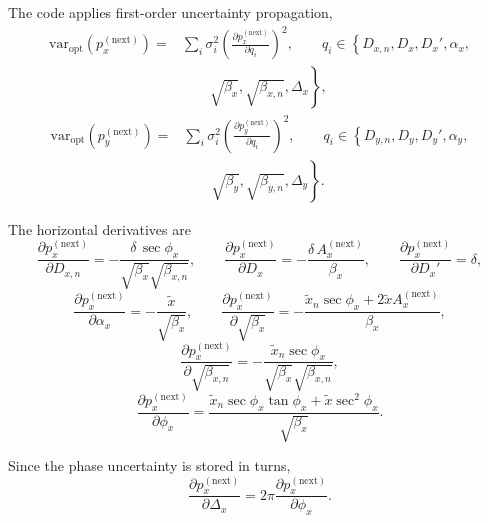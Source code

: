 The code applies first-order uncertainty propagation,
\begin{equation}
\begin{split}
\mathrm{var}_{\mathrm{opt}}\!\left(p_x^{(\mathrm{next})}\right)
=&
\sum_i \sigma_i^2
\left(
\frac{\partial p_x^{(\mathrm{next})}}{\partial q_i}
\right)^2,
\qquad q_i \in \left\{
D_{x,n}, D_x, D_x', \alpha_x,\right.\\
&\qquad\left.\sqrt{\beta_x}, \sqrt{\beta_{x,n}}, \Delta_x
\right\},
\end{split}
\end{equation}
\begin{equation}
\begin{split}
\mathrm{var}_{\mathrm{opt}}\!\left(p_y^{(\mathrm{next})}\right)
=&
\sum_i \sigma_i^2
\left(
\frac{\partial p_y^{(\mathrm{next})}}{\partial q_i}
\right)^2,
\qquad q_i \in \left\{
D_{y,n}, D_y, D_y', \alpha_y,\right.\\
&\qquad\left.\sqrt{\beta_y}, \sqrt{\beta_{y,n}}, \Delta_y
\right\}.
\end{split}
\end{equation}

The horizontal derivatives are
\begin{equation}
\frac{\partial p_x^{(\mathrm{next})}}{\partial D_{x,n}}
=
- \frac{\delta\,\sec\phi_x}{\sqrt{\beta_x}\sqrt{\beta_{x,n}}},
\qquad
\frac{\partial p_x^{(\mathrm{next})}}{\partial D_x}
=
- \frac{\delta\,A_x^{(\mathrm{next})}}{\beta_x},
\qquad
\frac{\partial p_x^{(\mathrm{next})}}{\partial D_x'}
=
\delta,
\end{equation}
\begin{equation}
\frac{\partial p_x^{(\mathrm{next})}}{\partial \alpha_x}
=
- \frac{\tilde x}{\sqrt{\beta_x}},
\qquad
\frac{\partial p_x^{(\mathrm{next})}}{\partial \sqrt{\beta_x}}
=
- \frac{\tilde x_n \sec\phi_x + 2\tilde x A_x^{(\mathrm{next})}}{\beta_x},
\end{equation}
\begin{equation}
\frac{\partial p_x^{(\mathrm{next})}}{\partial \sqrt{\beta_{x,n}}}
=
- \frac{\tilde x_n \sec\phi_x}{\sqrt{\beta_x}\sqrt{\beta_{x,n}}},
\end{equation}
\begin{equation}
\frac{\partial p_x^{(\mathrm{next})}}{\partial \phi_x}
=
\frac{\tilde x_n \sec\phi_x\tan\phi_x + \tilde x \sec^2\phi_x}{\sqrt{\beta_x}}.
\end{equation}

Since the phase uncertainty is stored in turns,
\begin{equation}
\frac{\partial p_x^{(\mathrm{next})}}{\partial \Delta_x}
=
2\pi \frac{\partial p_x^{(\mathrm{next})}}{\partial \phi_x}.
\end{equation}

